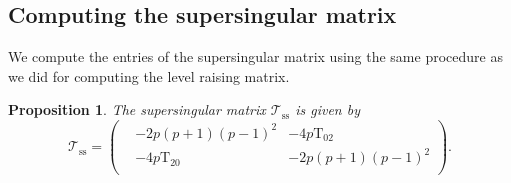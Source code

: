 \documentclass[10pt]{amsart}
\numberwithin{equation}{section}
\newtheorem{proposition}[equation]{Proposition}
\theoremstyle{definition}
\def\calT{\mathcal{T}}
\def\rmT{\mathrm{T}}
\begin{document}
\subsection{Computing the supersingular matrix} We compute the entries of the supersingular matrix using the same procedure as we did for computing the  level raising matrix. 
\begin{proposition}\label{ss-matrix}
The supersingular matrix $\calT_{\mathrm{ss}}$ is given by
\begin{equation*}
\calT_{\mathrm{ss}}=\begin{pmatrix} &-2p(p+1)(p-1)^{2} & -4p\rmT_{02}\\ &-4p\rmT_{20}& -2p(p+1)(p-1)^{2}\\ \end{pmatrix}.
\end{equation*}
\end{proposition}
\end{document}
